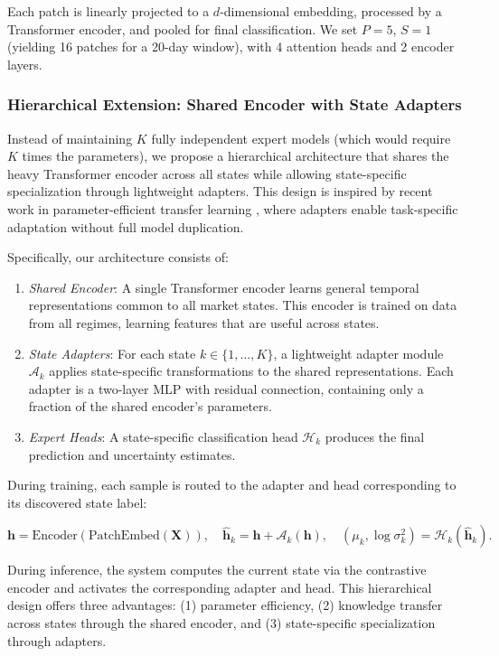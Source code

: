 \documentclass[review]{elsarticle}
\begin{document}
Each patch is linearly projected to a $d$-dimensional embedding, processed by a Transformer encoder, and pooled for final classification. We set $P=5$, $S=1$ (yielding 16 patches for a 20-day window), with 4 attention heads and 2 encoder layers.

\subsubsection{Hierarchical Extension: Shared Encoder with State Adapters}

Instead of maintaining $K$ fully independent expert models (which would require $K$ times the parameters), we propose a hierarchical architecture that shares the heavy Transformer encoder across all states while allowing state-specific specialization through lightweight adapters. This design is inspired by recent work in parameter-efficient transfer learning \citep{hu2021lora}, where adapters enable task-specific adaptation without full model duplication.

Specifically, our architecture consists of:

\begin{enumerate}
\item \textit{Shared Encoder}: A single Transformer encoder learns general temporal representations common to all market states. This encoder is trained on data from all regimes, learning features that are useful across states.
\item \textit{State Adapters}: For each state $k \in \{1,\ldots,K\}$, a lightweight adapter module $\mathcal{A}_k$ applies state-specific transformations to the shared representations. Each adapter is a two-layer MLP with residual connection, containing only a fraction of the shared encoder's parameters.
\item \textit{Expert Heads}: A state-specific classification head $\mathcal{H}_k$ produces the final prediction and uncertainty estimates.
\end{enumerate}

During training, each sample is routed to the adapter and head corresponding to its discovered state label:

\begin{equation}
\mathbf{h} = \text{Encoder}(\text{PatchEmbed}(\mathbf{X})), \quad \hat{\mathbf{h}}_k = \mathbf{h} + \mathcal{A}_k(\mathbf{h}), \quad (\mu_k, \log\sigma^2_k) = \mathcal{H}_k(\hat{\mathbf{h}}_k).
\end{equation}

During inference, the system computes the current state via the contrastive encoder and activates the corresponding adapter and head. This hierarchical design offers three advantages: (1) parameter efficiency, (2) knowledge transfer across states through the shared encoder, and (3) state-specific specialization through adapters.
\end{document}
